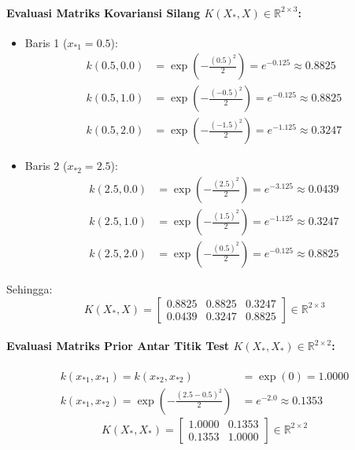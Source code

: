 \documentclass[11pt,a4paper]{article}
\begin{document}
\paragraph{Evaluasi Matriks Kovariansi Silang $K(X_*, X) \in \mathbb{R}^{2 \times 3}$:}
\begin{itemize}
    \item Baris 1 ($x_{*1} = 0.5$):
    \begin{align*}
    k(0.5, 0.0) &= \exp\left(-\frac{(0.5)^2}{2}\right) = e^{-0.125} \approx 0.8825 \\
    k(0.5, 1.0) &= \exp\left(-\frac{(-0.5)^2}{2}\right) = e^{-0.125} \approx 0.8825 \\
    k(0.5, 2.0) &= \exp\left(-\frac{(-1.5)^2}{2}\right) = e^{-1.125} \approx 0.3247
    \end{align*}
    \item Baris 2 ($x_{*2} = 2.5$):
    \begin{align*}
    k(2.5, 0.0) &= \exp\left(-\frac{(2.5)^2}{2}\right) = e^{-3.125} \approx 0.0439 \\
    k(2.5, 1.0) &= \exp\left(-\frac{(1.5)^2}{2}\right) = e^{-1.125} \approx 0.3247 \\
    k(2.5, 2.0) &= \exp\left(-\frac{(0.5)^2}{2}\right) = e^{-0.125} \approx 0.8825
    \end{align*}
\end{itemize}
Sehingga:
\begin{equation}
K(X_*, X) = \begin{bmatrix}
0.8825 & 0.8825 & 0.3247 \\
0.0439 & 0.3247 & 0.8825
\end{bmatrix} \in \mathbb{R}^{2 \times 3}
\end{equation}

\paragraph{Evaluasi Matriks Prior Antar Titik Test $K(X_*, X_*) \in \mathbb{R}^{2 \times 2}$:}
\begin{align*}
k(x_{*1}, x_{*1}) = k(x_{*2}, x_{*2}) &= \exp(0) = 1.0000 \\
k(x_{*1}, x_{*2}) = \exp\left(-\frac{(2.5 - 0.5)^2}{2}\right) &= e^{-2.0} \approx 0.1353
\end{align*}
\begin{equation}
K(X_*, X_*) = \begin{bmatrix}
1.0000 & 0.1353 \\
0.1353 & 1.0000
\end{bmatrix} \in \mathbb{R}^{2 \times 2}
\end{equation}
\end{document}
